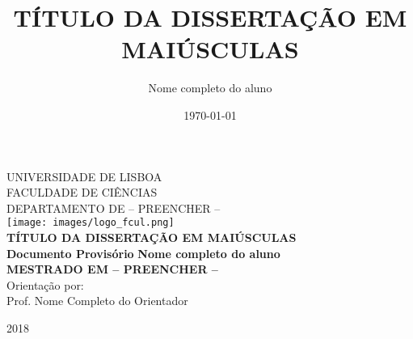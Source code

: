 \documentclass[11pt,openright,twoside]{report}
\numberwithin{equation}{chapter}
\newcommand{\TITULO}{TÍTULO DA DISSERTAÇÃO EM MAIÚSCULAS}
\newcommand{\Autor}{Nome completo do aluno}
\newcommand{\Orientador}{Nome Completo do Orientador}
\newcommand{\CoOrientador}{Nome Completo do Co-Orientador} %
\newcommand{\SupervisorInstituicao}{Nome Completo do Supervisor}  %
\newcommand{\Ano}{\Large{2018}}
\newcommand{\MESTRADO}{MESTRADO EM -- PREENCHER --}
\newcommand{\IdiomaTese}{\selectlanguage{portuguese}}
\begin{document}
\title{\TITULO}
\author{\Autor}
\date{\today}


\pagestyle{empty}


\begin{center}
\vspace{1cm}\normalfont\normalfont
\vfill
\textsc{\normalsize\uppercase{Universidade de Lisboa}}\\
\normalsize\uppercase{Faculdade de Ciências}\\
\normalsize\uppercase{Departamento de -- PREENCHER --}\\
\vspace{1cm}
\texttt{[image: images/logo\_fcul.png]}\\

\vspace{2.5cm}
\vfill
\IdiomaTese
\Large{\bf \TITULO}\\
\vspace{1.3cm}
\normalsize{\bf{Documento Provisório}}
\vspace{1cm}
\vfill
\Large{\bf \Autor}\\
\vspace{1,8 cm}
\vfill
\large{\bf{\MESTRADO}}\\
\vspace{2.3cm}
\vfill
\large{Orientação por:}\\
\large{Prof. \Orientador} \\
\vspace{1.5 cm}
\vfill

\vfill
\Ano
\end{center}

\end{document}
